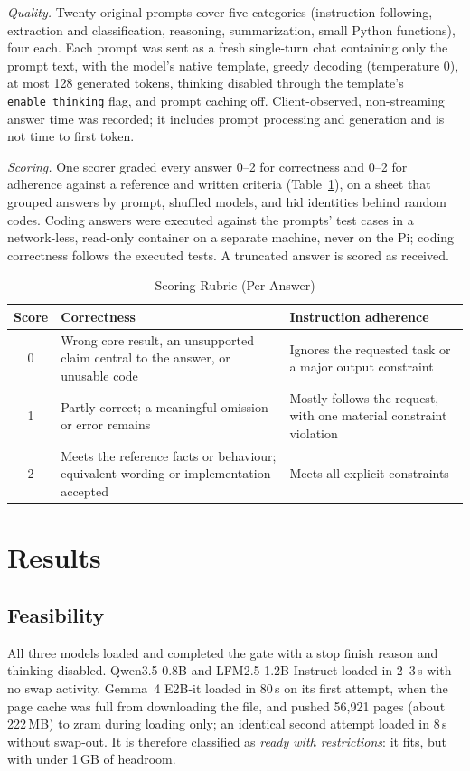 \documentclass[conference]{IEEEtran}
\newcommand{\qwen}{Qwen3.5-0.8B}
\newcommand{\lfm}{LFM2.5-1.2B-Instruct}
\newcommand{\gemma}{Gemma~4 E2B-it}
\begin{document}
\emph{Quality.} Twenty original prompts cover five categories (instruction following, extraction and classification, reasoning, summarization, small Python functions), four each. Each prompt was sent as a fresh single-turn chat containing only the prompt text, with the model's native template, greedy decoding (temperature 0), at most 128 generated tokens, thinking disabled through the template's \texttt{enable\_thinking} flag, and prompt caching off. Client-observed, non-streaming answer time was recorded; it includes prompt processing and generation and is not time to first token.

\emph{Scoring.} One scorer graded every answer 0--2 for correctness and 0--2 for adherence against a reference and written criteria (Table~\ref{tab:rubric}), on a sheet that grouped answers by prompt, shuffled models, and hid identities behind random codes. Coding answers were executed against the prompts' test cases in a network-less, read-only container on a separate machine, never on the Pi; coding correctness follows the executed tests. A truncated answer is scored as received.

\begin{table}[t]
\caption{Scoring Rubric (Per Answer)}
\label{tab:rubric}
\centering
\footnotesize
\begin{tabular}{@{}cp{}p{}@{}}
\toprule
Score & Correctness & Instruction adherence \\
\midrule
0 & Wrong core result, an unsupported claim central to the answer, or unusable code & Ignores the requested task or a major output constraint \\
1 & Partly correct; a meaningful omission or error remains & Mostly follows the request, with one material constraint violation \\
2 & Meets the reference facts or behaviour; equivalent wording or implementation accepted & Meets all explicit constraints \\
\bottomrule
\end{tabular}
\end{table}

\section{Results}

\subsection{Feasibility}
All three models loaded and completed the gate with a stop finish reason and thinking disabled. \qwen{} and \lfm{} loaded in 2--3\,s with no swap activity. \gemma{} loaded in 80\,s on its first attempt, when the page cache was full from downloading the file, and pushed 56{,}921 pages (about 222\,MB) to zram during loading only; an identical second attempt loaded in 8\,s without swap-out. It is therefore classified as \emph{ready with restrictions}: it fits, but with under 1\,GB of headroom.
\end{document}
